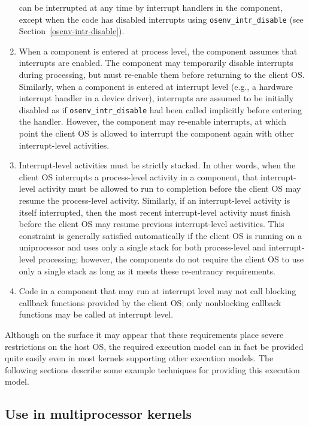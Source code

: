 \begin{enumerate}
	can be interrupted at any time
	by interrupt handlers in the component,
	except when the code has disabled interrupts
	using {\tt osenv_intr_disable} (see Section~\ref{osenv-intr-disable}).
\item	When a component is entered at process level,
	the component assumes that interrupts are enabled.
	The component may temporarily disable interrupts during processing,
	but must re-enable them before returning to the client OS\@.
	Similarly, when a component is entered at interrupt level
	(e.g., a hardware interrupt handler in a device driver),
	interrupts are assumed to be initially disabled
	as if {\tt osenv_intr_disable} had been called implicitly
	before entering the handler.
	However, the component may re-enable interrupts,
	at which point the client OS is allowed
	to interrupt the component again with other interrupt-level activities.
\item	Interrupt-level activities must be strictly stacked.
	In other words,
	when the client OS interrupts a process-level activity in a component,
	that interrupt-level activity
	must be allowed to run to completion
	before the client OS may resume the process-level activity.
	Similarly, if an interrupt-level activity is itself interrupted,
	then the most recent interrupt-level activity must finish
	before the client OS may resume previous interrupt-level activities.
	This constraint is generally satisfied automatically
	if the client OS is running on a uniprocessor
	and uses only a single stack
	for both process-level and interrupt-level processing;
	however, the \oskit{} components
	do not require the client OS to use only a single stack
	as long as it meets these re-entrancy requirements.
\item	Code in a component that may run at interrupt level 
	may not call blocking callback functions
	provided by the client OS;
	only nonblocking callback functions may be called at interrupt level.
\end{enumerate}

Although on the surface it may appear
that these requirements place severe restrictions on the host OS,
the required execution model can in fact be provided
quite easily even in most kernels supporting other execution models.
The following sections describe some example techniques
for providing this execution model.

\subsection{Use in multiprocessor kernels}

